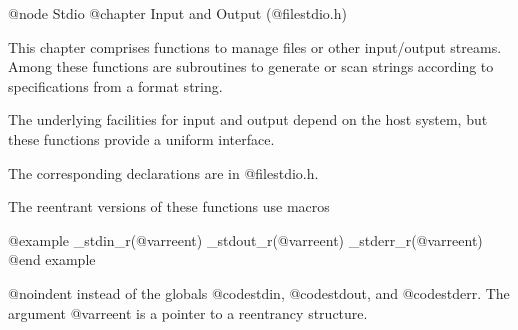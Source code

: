 @node Stdio
@chapter Input and Output (@file{stdio.h})

This chapter comprises functions to manage files
or other input/output streams. Among these functions are subroutines
to generate or scan strings according to specifications from a format string.

The underlying facilities for input and output depend on the host
system, but these functions provide a uniform interface.

The corresponding declarations are in @file{stdio.h}.

The reentrant versions of these functions use macros

@example
_stdin_r(@var{reent})
_stdout_r(@var{reent})
_stderr_r(@var{reent})
@end example

@noindent
instead of the globals @code{stdin}, @code{stdout}, and
@code{stderr}.  The argument @var{reent} is a pointer to a reentrancy
structure.

